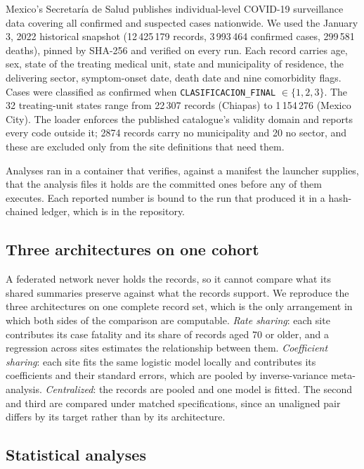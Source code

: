 \documentclass[11pt]{article}
\begin{document}
Mexico's Secretar\'{i}a de Salud publishes individual-level COVID-19
surveillance data covering all confirmed and suspected cases
nationwide.  We used the January 3, 2022 historical snapshot
(12\,425\,179 records, 3\,993\,464 confirmed cases, 299\,581 deaths),
pinned by SHA-256 and verified on every run.  Each record carries age,
sex, state of the treating medical unit, state and municipality of
residence, the delivering sector, symptom-onset date, death date and
nine comorbidity flags.  Cases were classified as confirmed when
\texttt{CLASIFICACION\_FINAL} $\in \{1,2,3\}$.  The 32 treating-unit
states range from 22\,307 records (Chiapas) to 1\,154\,276 (Mexico
City).  The loader enforces the published catalogue's validity domain
and reports every code outside it; 2874 records carry no municipality
and 20 no sector, and these are excluded only from the site definitions
that need them.

Analyses ran in a container that verifies, against a manifest the
launcher supplies, that the analysis files it holds are the committed
ones before any of them executes.  Each reported number is bound to the
run that produced it in a hash-chained ledger, which is in the
repository.

\subsection{Three architectures on one cohort}

A federated network never holds the records, so it cannot compare what
its shared summaries preserve against what the records support.  We
reproduce the three architectures on one complete record set, which is
the only arrangement in which both sides of the comparison are
computable.  \emph{Rate sharing}: each site contributes its case
fatality and its share of records aged 70 or older, and a regression
across sites estimates the relationship between them.  \emph{Coefficient
sharing}: each site fits the same logistic model locally and contributes
its coefficients and their standard errors, which are pooled by
inverse-variance meta-analysis.  \emph{Centralized}: the records are
pooled and one model is fitted.  The second and third are compared under
matched specifications, since an unaligned pair differs by its target
rather than by its architecture.

\subsection{Statistical analyses}
\end{document}

